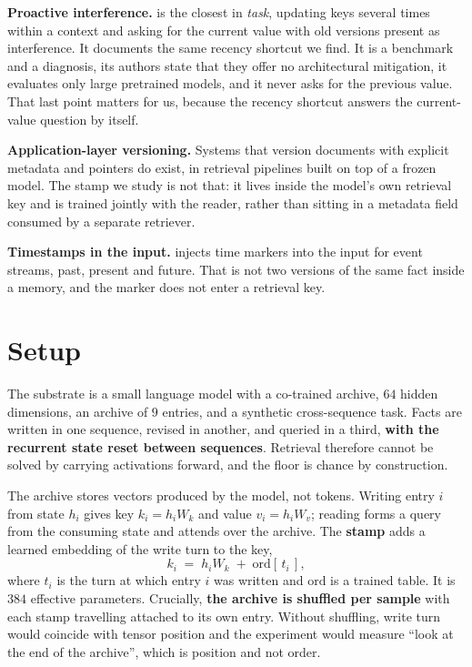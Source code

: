 \documentclass[11pt,a4paper]{article}
\begin{document}
\textbf{Proactive interference.} \citet{unabletoforget} is the closest in \emph{task}, updating keys
several times within a context and asking for the current value with old versions present as
interference. It documents the same recency shortcut we find. It is a benchmark and a diagnosis, its
authors state that they offer no architectural mitigation, it evaluates only large pretrained models,
and it never asks for the previous value. That last point matters for us, because the recency shortcut
answers the current-value question by itself.

\textbf{Application-layer versioning.} Systems that version documents with explicit metadata and
pointers do exist, in retrieval pipelines built on top of a frozen model. The stamp we study is not
that: it lives inside the model's own retrieval key and is trained jointly with the reader, rather than
sitting in a metadata field consumed by a separate retriever.

\textbf{Timestamps in the input.} \citet{tslm} injects time markers into the input for event streams,
past, present and future. That is not two versions of the same fact inside a memory, and the marker
does not enter a retrieval key.

\section{Setup}

The substrate is a small language model with a co-trained archive, $64$ hidden dimensions, an archive
of $9$ entries, and a synthetic cross-sequence task. Facts are written in one sequence, revised in
another, and queried in a third, \textbf{with the recurrent state reset between sequences}. Retrieval
therefore cannot be solved by carrying activations forward, and the floor is chance by construction.

The archive stores vectors produced by the model, not tokens. Writing entry $i$ from state $h_i$ gives
key $k_i = h_i W_k$ and value $v_i = h_i W_v$; reading forms a query from the consuming state and
attends over the archive. The \textbf{stamp} adds a learned embedding of the write turn to the key,
\[
k_i \;=\; h_i W_k \;+\; \mathrm{ord}[\,t_i\,],
\]
where $t_i$ is the turn at which entry $i$ was written and $\mathrm{ord}$ is a trained table. It is
$384$ effective parameters. Crucially, \textbf{the archive is shuffled per sample} with each stamp
travelling attached to its own entry. Without shuffling, write turn would coincide with tensor
position and the experiment would measure ``look at the end of the archive'', which is position and
not order.
\end{document}
